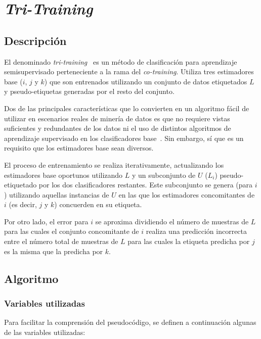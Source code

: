 \section{\textit{Tri-Training}}

\subsection{Descripción}


El denominado \textit{tri-training}~\cite{tritraining2005@original} es un método de clasificación para aprendizaje semisupervisado perteneciente a la rama del \textit{co-training}. Utiliza tres estimadores base ($i$, $j$ y $k$) que son entrenados utilizando un conjunto de datos etiquetados $L$ y pseudo-etiquetas generadas por el resto del conjunto.

Dos de las principales características que lo convierten en un algoritmo fácil de utilizar en escenarios reales de minería de datos es que no requiere vistas suficientes y redundantes de los datos ni el uso de distintos algoritmos de aprendizaje supervisado en los clasificadores base~\cite{tritraining2005@original}. Sin embargo, sí que es un requisito que los estimadores base sean diversos.

El proceso de entrenamiento se realiza iterativamente, actualizando los estimadores base oportunos utilizando $L$ y un subconjunto de $U$ ($L_i$) pseudo-etiquetado por los dos clasificadores restantes. Este subconjunto se genera (para $i$) utilizando aquellas instancias de $U$ en las que los estimadores concomitantes de $i$ (es decir, $j$ y $k$) concuerden en su etiqueta.

Por otro lado, el error para $i$ se aproxima dividiendo el número de muestras de $L$ para las cuales el conjunto concomitante de $i$ realiza una predicción incorrecta entre el número total de muestras de $L$ para las cuales la etiqueta predicha por $j$ es la misma que la predicha por $k$.

\subsection{Algoritmo}

\subsubsection{Variables utilizadas}

Para facilitar la comprensión del pseudocódigo, se definen a continuación algunas de las variables utilizadas:

